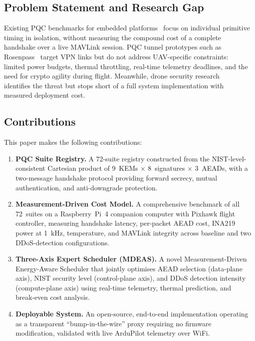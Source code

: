 \documentclass[conference]{IEEEtran}
\begin{document}
\subsection{Problem Statement and Research Gap}

Existing PQC benchmarks for embedded platforms~\cite{pqm4, pqc-arm-bench} focus on individual primitive timing in isolation, without measuring the compound cost of a complete handshake over a live MAVLink session.
PQC tunnel prototypes such as Rosenpass~\cite{rosenpass} target VPN links but do not address UAV-specific constraints: limited power budgets, thermal throttling, real-time telemetry deadlines, and the need for crypto agility during flight.
Meanwhile, drone security research~\cite{drone-security-survey, drone-pqc-analysis} identifies the threat but stops short of a full system implementation with measured deployment cost.

\subsection{Contributions}

This paper makes the following contributions:

\begin{enumerate}[label=\textbf{C\arabic*}, leftmargin=2em]
    \item \textbf{PQC Suite Registry.} A 72-suite registry constructed from the NIST-level-consistent Cartesian product of 9~KEMs $\times$ 8~signatures $\times$ 3~AEADs, with a two-message handshake protocol providing forward secrecy, mutual authentication, and anti-downgrade protection.

    \item \textbf{Measurement-Driven Cost Model.} A comprehensive benchmark of all 72~suites on a Raspberry~Pi~4 companion computer with Pixhawk flight controller, measuring handshake latency, per-packet AEAD cost, INA219 power at \SI{1}{\kilo\hertz}, temperature, and MAVLink integrity across baseline and two DDoS-detection configurations.

    \item \textbf{Three-Axis Expert Scheduler (MDEAS).} A novel Measurement-Driven Energy-Aware Scheduler that jointly optimises AEAD selection (data-plane axis), NIST security level (control-plane axis), and DDoS detection intensity (compute-plane axis) using real-time telemetry, thermal prediction, and break-even cost analysis.

    \item \textbf{Deployable System.} An open-source, end-to-end implementation operating as a transparent ``bump-in-the-wire'' proxy requiring no firmware modification, validated with live ArduPilot telemetry over WiFi.
\end{enumerate}
\end{document}

